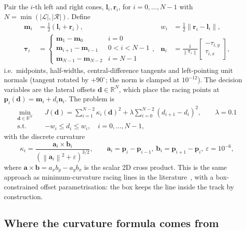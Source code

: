 \documentclass[10pt,a4paper]{scrartcl}
\newcommand{\R}{\mathbb{R}}
\newcommand{\norm}[1]{\left\lVert #1 \right\rVert}
\begin{document}
  Pair the $i$-th left and right cones, $\bm l_i,\bm r_i$, for $i=0,\dots,N-1$ with
  $N=\min(|\mathcal L|,|\mathcal R|)$. Define
  \begin{align}
    \bm m_i &= \tfrac12(\bm l_i+\bm r_i), &
    w_i &= \tfrac12\norm{\bm r_i-\bm l_i}, \\
    \bm\tau_i &= \begin{cases}\bm m_1-\bm m_0 & i=0\\ \bm m_{i+1}-\bm m_{i-1} & 0<i<N-1\\ \bm m_{N-1}-\bm m_{N-2} & i=N-1\end{cases}, &
    \bm n_i &= \frac{1}{\norm{\bm\tau_i}}\begin{bmatrix}-\tau_{i,y}\\ \tau_{i,x}\end{bmatrix},
  \end{align}
  i.e.\ midpoints, half-widths, central-difference tangents and left-pointing unit
  normals (tangent rotated by $+90^\circ$; the norm is clamped at $10^{-12}$). The
  decision variables are the lateral offsets $\bm d\in\R^N$, which place the racing
  points at $\bm p_i(\bm d)=\bm m_i+d_i\bm n_i$. The problem is
  \begin{equation}
    \begin{aligned}
    \min_{\bm d\in\R^N}\quad & J(\bm d)=\sum_{i=1}^{N-2}\kappa_i(\bm d)^2+\lambda\sum_{i=0}^{N-2}(d_{i+1}-d_i)^2,\qquad\lambda=0.1\\
    \text{s.t.}\quad & -w_i\le d_i\le w_i,\quad i=0,\dots,N-1,
    \end{aligned}
    \label{eq:racing}
  \end{equation}
  with the discrete curvature
  \begin{equation}
    \kappa_i=\frac{\bm a_i\times\bm b_i}{\left(\norm{\bm a_i}^2+\varepsilon\right)^{3/2}},\qquad
    \bm a_i=\bm p_i-\bm p_{i-1},\ \bm b_i=\bm p_{i+1}-\bm p_i,\ \varepsilon=10^{-6},
    \label{eq:kappa}
  \end{equation}
  where $\bm a\times\bm b=a_xb_y-a_yb_x$ is the scalar 2D cross product. This is the
  same approach as minimum-curvature racing lines in the
  literature~\citep{heilmeier2020minimum}, with a box-constrained offset
  parametrisation: the box keeps the line inside the track by construction.

  \subsection{Where the curvature formula comes from}
\end{document}

